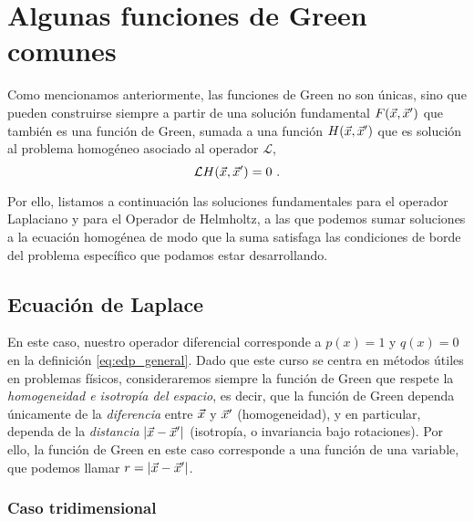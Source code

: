 \section{Algunas funciones de Green comunes}

Como mencionamos anteriormente, las funciones de Green no son únicas, sino que pueden construirse siempre a partir de una solución fundamental $F(\vec{x},\vec{x}')$ que también es una función de Green, sumada a una función $H(\vec{x},\vec{x}')$ que es solución al problema homogéneo asociado al operador $\mathcal{L}$,
\begin{equation}
    \mathcal{L} H(\vec{x},\vec{x}') = 0 \ .
\end{equation} 

Por ello, listamos a continuación las soluciones fundamentales para el operador Laplaciano y para el Operador de Helmholtz, a las que podemos sumar soluciones a la ecuación homogénea de modo que la suma satisfaga las condiciones de borde del problema específico que podamos estar desarrollando.

\subsection{Ecuación de Laplace}

En este caso, nuestro operador diferencial corresponde a $p(x) = 1$ y $q(x) = 0$ en la definición \eqref{eq:edp_general}. Dado que este curso se centra en métodos útiles en problemas físicos, consideraremos siempre la función de Green que respete la \emph{homogeneidad e isotropía del espacio}, es decir, que la función de Green dependa únicamente de la \emph{diferencia} entre $\vec{x}$ y $\vec{x}'$ (homogeneidad), y en particular, dependa de la \emph{distancia} $|\vec{x} - \vec{x}'|$ (isotropía, o invariancia bajo rotaciones). Por ello, la función de Green en este caso corresponde a una función de una variable, que podemos llamar $r = |\vec{x} - \vec{x}'|$.

\subsubsection{Caso tridimensional}

